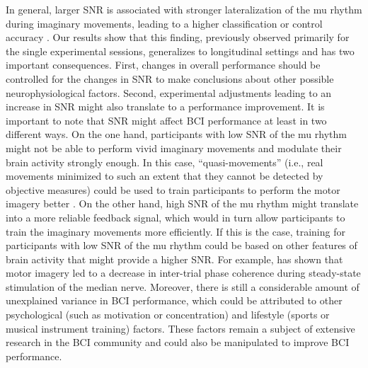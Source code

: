 \medskip

In general, larger SNR is associated with stronger lateralization of the mu rhythm during imaginary movements, leading to a higher classification or control accuracy \citep{Maeder2012}. Our results show that this finding, previously observed primarily for the single experimental sessions, generalizes to longitudinal settings and has two important consequences. First, changes in overall performance should be controlled for the changes in SNR to make conclusions about other possible neurophysiological factors. Second, experimental adjustments leading to an increase in SNR might also translate to a performance improvement. It is important to note that SNR might affect BCI performance at least in two different ways. On the one hand, participants with low SNR of the mu rhythm might not be able to perform vivid imaginary movements and modulate their brain activity strongly enough. In this case, ``quasi-movements'' (i.e., real movements minimized to such an extent that they cannot be detected by objective measures) could be used to train participants to perform the motor imagery better \citep{Nikulin2008}. On the other hand, high SNR of the mu rhythm might translate into a more reliable feedback signal, which would in turn allow participants to train the imaginary movements more efficiently. If this is the case, training for participants with low SNR of the mu rhythm could be based on other features of brain activity that might provide a higher SNR. For example, \cite{Tao2021} has shown that motor imagery led to a decrease in inter-trial phase coherence during steady-state stimulation of the median nerve. Moreover, there is still a considerable amount of unexplained variance in BCI performance, which could be attributed to other psychological (such as motivation or concentration) and lifestyle (sports or musical instrument training) factors. These factors remain a subject of extensive research in the BCI community \citep{Hammer2012, Jeunet2015} and could also be manipulated to improve BCI performance.

\medskip

